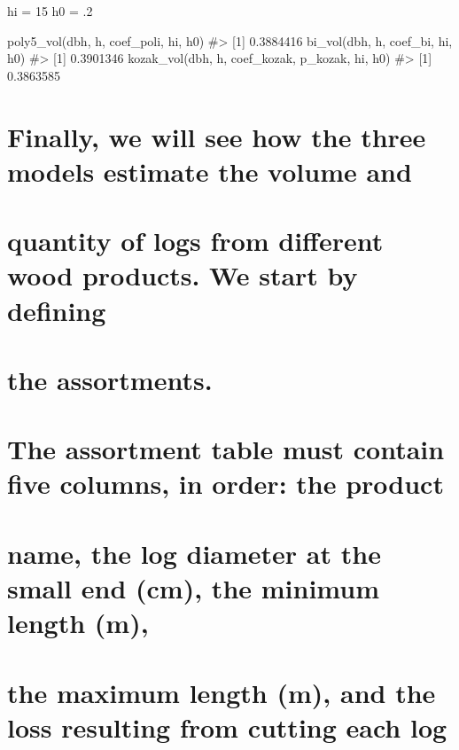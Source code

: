 \documentclass[
]{article}
\begin{document}
hi = 15 h0 = .2

poly5\_vol(dbh, h, coef\_poli, hi, h0) \#\textgreater{} {[}1{]}
0.3884416 bi\_vol(dbh, h, coef\_bi, hi, h0) \#\textgreater{} {[}1{]}
0.3901346 kozak\_vol(dbh, h, coef\_kozak, p\_kozak, hi, h0)
\#\textgreater{} {[}1{]} 0.3863585

\hypertarget{finally-we-will-see-how-the-three-models-estimate-the-volume-and}{%
\section{Finally, we will see how the three models estimate the volume
and}\label{finally-we-will-see-how-the-three-models-estimate-the-volume-and}}

\hypertarget{quantity-of-logs-from-different-wood-products.-we-start-by-defining}{%
\section{quantity of logs from different wood products. We start by
defining}\label{quantity-of-logs-from-different-wood-products.-we-start-by-defining}}

\hypertarget{the-assortments.}{%
\section{the assortments.}\label{the-assortments.}}

\hypertarget{the-assortment-table-must-contain-five-columns-in-order-the-product}{%
\section{The assortment table must contain five columns, in order: the
product}\label{the-assortment-table-must-contain-five-columns-in-order-the-product}}

\hypertarget{name-the-log-diameter-at-the-small-end-cm-the-minimum-length-m}{%
\section{name, the log diameter at the small end (cm), the minimum
length
(m),}\label{name-the-log-diameter-at-the-small-end-cm-the-minimum-length-m}}

\hypertarget{the-maximum-length-m-and-the-loss-resulting-from-cutting-each-log}{%
\section{the maximum length (m), and the loss resulting from cutting
each
log}\label{the-maximum-length-m-and-the-loss-resulting-from-cutting-each-log}}
\end{document}
